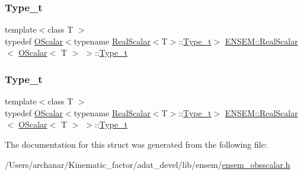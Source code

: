 \subsubsection{\texorpdfstring{Type\_t}{Type\_t}\hspace{0.1cm}{\footnotesize\ttfamily [1/2]}}
{\footnotesize\ttfamily template$<$class T $>$ \\
typedef \mbox{\hyperlink{classENSEM_1_1OScalar}{O\+Scalar}}$<$typename \mbox{\hyperlink{structENSEM_1_1RealScalar}{Real\+Scalar}}$<$T$>$\+::\mbox{\hyperlink{structENSEM_1_1RealScalar_3_01OScalar_3_01T_01_4_01_4_a6c39297bc962beb39d2b33a9cdf329dd}{Type\+\_\+t}}$>$ \mbox{\hyperlink{structENSEM_1_1RealScalar}{E\+N\+S\+E\+M\+::\+Real\+Scalar}}$<$ \mbox{\hyperlink{classENSEM_1_1OScalar}{O\+Scalar}}$<$ T $>$ $>$\+::\mbox{\hyperlink{structENSEM_1_1RealScalar_3_01OScalar_3_01T_01_4_01_4_a6c39297bc962beb39d2b33a9cdf329dd}{Type\+\_\+t}}}

\mbox{\label{structENSEM_1_1RealScalar_3_01OScalar_3_01T_01_4_01_4_a6c39297bc962beb39d2b33a9cdf329dd}} 
\subsubsection{\texorpdfstring{Type\_t}{Type\_t}\hspace{0.1cm}{\footnotesize\ttfamily [2/2]}}
{\footnotesize\ttfamily template$<$class T $>$ \\
typedef \mbox{\hyperlink{classENSEM_1_1OScalar}{O\+Scalar}}$<$typename \mbox{\hyperlink{structENSEM_1_1RealScalar}{Real\+Scalar}}$<$T$>$\+::\mbox{\hyperlink{structENSEM_1_1RealScalar_3_01OScalar_3_01T_01_4_01_4_a6c39297bc962beb39d2b33a9cdf329dd}{Type\+\_\+t}}$>$ \mbox{\hyperlink{structENSEM_1_1RealScalar}{E\+N\+S\+E\+M\+::\+Real\+Scalar}}$<$ \mbox{\hyperlink{classENSEM_1_1OScalar}{O\+Scalar}}$<$ T $>$ $>$\+::\mbox{\hyperlink{structENSEM_1_1RealScalar_3_01OScalar_3_01T_01_4_01_4_a6c39297bc962beb39d2b33a9cdf329dd}{Type\+\_\+t}}}



The documentation for this struct was generated from the following file\+:\begin{DoxyCompactItemize}
\item 
/\+Users/archanar/\+Kinematic\+\_\+factor/adat\+\_\+devel/lib/ensem/\mbox{\hyperlink{lib_2ensem_2ensem__obsscalar_8h}{ensem\+\_\+obsscalar.\+h}}\end{DoxyCompactItemize}
